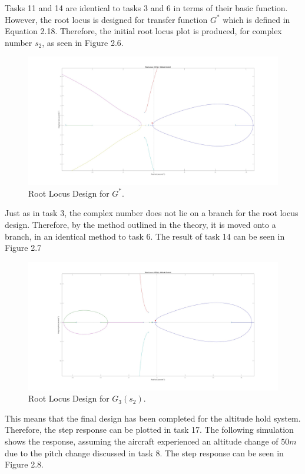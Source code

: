 \documentclass[stu, a4paper, 12pt, floatsintext]{apa7}
\numberwithin{figure}{section}
\numberwithin{table}{section}
\numberwithin{equation}{section}
\begin{document}
Tasks 11 and 14 are identical to tasks 3 and 6 in terms of their basic function. However, the root locus is designed for transfer function $G^*$ which is defined in Equation 2.18. Therefore, the initial root locus plot is produced, for complex number $s_2$, as seen in Figure 2.6. 
\begin{figure}[H]
    \caption{Root Locus Design for $G^*$.}
    \label{fig:task11_result}
    \centering
    \includegraphics[width=1.0\textwidth]{pictures/Auotpilot/Task11.jpg}
\end{figure}
Just as in task 3, the complex number does not lie on a branch for the root locus design. Therefore, by the method outlined in the theory, it is moved onto a branch, in an identical method to task 6. The result of task 14 can be seen in Figure 2.7
\begin{figure}[H]
    \caption{Root Locus Design for $G_3(s_2)$.}
    \label{fig:task14_result}
    \centering
    \includegraphics[width=1.0\textwidth]{pictures/Auotpilot/Task14.jpg}
\end{figure}
This means that the final design has been completed for the altitude hold system. Therefore, the step response can be plotted in task 17. The following simulation shows the response, assuming the aircraft experienced  an altitude change of $50m$ due to the pitch change discussed in task 8. The step response can be seen in Figure 2.8.
\end{document}
